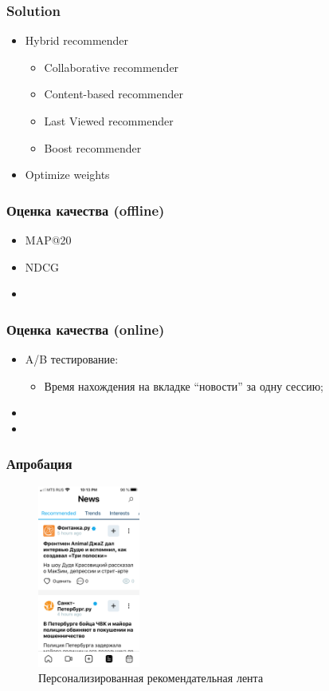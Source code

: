 \documentclass[xetex,mathserif,serif]{beamer}
\begin{document}
\begin{frame}
	\frametitle{Solution}

	\begin{itemize}
		\item Hybrid recommender
		      \begin{itemize}
			      \item Collaborative recommender
			      \item Content-based recommender
			      \item Last Viewed recommender
			      \item Boost recommender
		      \end{itemize}
		\item Optimize weights
	\end{itemize}
\end{frame}

\begin{frame}
    \frametitle{Оценка качества (offline)}

	\begin{itemize}
		\item MAP@20
		\item NDCG
		\item 
	\end{itemize}
\end{frame}


\begin{frame}
	\frametitle{Оценка качества (online)}

	\begin{itemize}
		\item A/B тестирование:
            \begin{itemize}
                \item Время нахождения на вкладке ``новости'' за одну сессию;
            \end{itemize}
		\item 
		\item 
	\end{itemize}
\end{frame}

\begin{frame}
	\frametitle{Апробация}

    \begin{figure}[h]
        \includegraphics[width=0.3\textwidth]{./images/screenshot.png}
        \caption{Персонализированная рекомендательная лента}
        \label{fig:feed}
        \centering
    \end{figure}

\end{frame}
\end{document}
